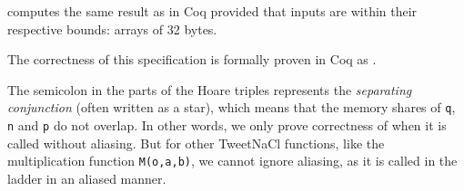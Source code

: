  computes the same result as 
in Coq provided that inputs are within their respective bounds: arrays of 32 bytes.

The correctness of this specification is formally proven in Coq as
.




The semicolon in the  parts of the Hoare triples represents the \emph{separating conjunction} (often written as a star), which means that
the memory shares of \texttt{q}, \texttt{n} and \texttt{p} do not overlap.
In other words,
we only prove correctness of  when it is called without aliasing.
But for other TweetNaCl functions, like the multiplication function \texttt{M(o,a,b)}, we cannot ignore aliasing, as it is called in the ladder in an aliased manner.

